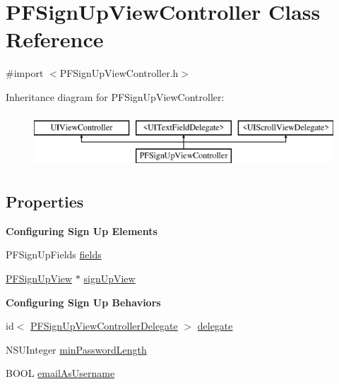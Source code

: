 \hypertarget{interface_p_f_sign_up_view_controller}{}\section{P\+F\+Sign\+Up\+View\+Controller Class Reference}
\label{interface_p_f_sign_up_view_controller}


{\ttfamily \#import $<$P\+F\+Sign\+Up\+View\+Controller.\+h$>$}

Inheritance diagram for P\+F\+Sign\+Up\+View\+Controller\+:\begin{figure}[H]
\begin{center}
\leavevmode
\includegraphics[height=2.000000cm]{interface_p_f_sign_up_view_controller}
\end{center}
\end{figure}
\subsection*{Properties}
\begin{Indent}{\bf Configuring Sign Up Elements}\par
{\em 

 

 }\begin{DoxyCompactItemize}
\item 
P\+F\+Sign\+Up\+Fields \hyperlink{interface_p_f_sign_up_view_controller_a14aee5e2f66057ce9a998fb8576d412b}{fields}
\item 
\hyperlink{interface_p_f_sign_up_view}{P\+F\+Sign\+Up\+View} $\ast$ \hyperlink{interface_p_f_sign_up_view_controller_aabe62b83ad3128c64650b19e995aad27}{sign\+Up\+View}
\end{DoxyCompactItemize}
\end{Indent}
\begin{Indent}{\bf Configuring Sign Up Behaviors}\par
{\em 

 

 }\begin{DoxyCompactItemize}
\item 
id$<$ \hyperlink{protocol_p_f_sign_up_view_controller_delegate-p}{P\+F\+Sign\+Up\+View\+Controller\+Delegate} $>$ \hyperlink{interface_p_f_sign_up_view_controller_a1150c82d22998c1f83f712e1e60a386a}{delegate}
\item 
N\+S\+U\+Integer \hyperlink{interface_p_f_sign_up_view_controller_a9142fa63faede5be9fe94ab55851c8a7}{min\+Password\+Length}
\item 
B\+O\+O\+L \hyperlink{interface_p_f_sign_up_view_controller_a90fe2f50758438dcc328bb9833ba6922}{email\+As\+Username}
\end{DoxyCompactItemize}
\end{Indent}


